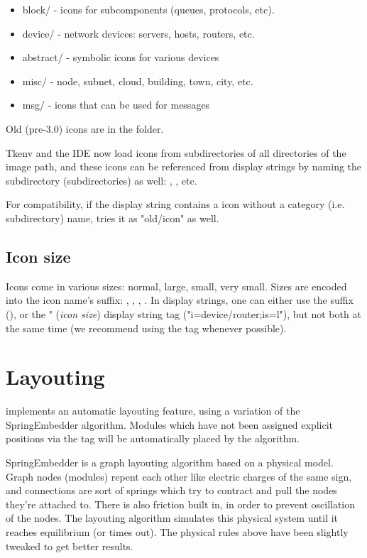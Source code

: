\begin{itemize}
  \item block/ - icons for subcomponents (queues, protocols, etc).
  \item device/ - network devices: servers, hosts, routers, etc.
  \item abstract/ - symbolic icons for various devices
  \item misc/ - node, subnet, cloud, building, town, city, etc.
  \item msg/ - icons that can be used for messages
\end{itemize}

Old (pre-3.0) icons are in the  folder.

Tkenv and the IDE now load icons from subdirectories of all directories
of the image path, and these icons can be referenced from display strings
by naming the subdirectory (subdirectories) as well:
, , etc.

For compatibility, if the display string contains a icon without
a category (i.e. subdirectory) name, {\opp} tries it as "old/icon" as well.

\subsection{Icon size}

Icons come in various sizes: normal, large, small, very small. Sizes are
encoded into the icon name's suffix: , , , .
In display strings, one can either use the suffix (),
or the " (\textit{icon size}) display string tag ("i=device/router;is=l"),
but not both at the same time (we recommend using the  tag whenever possible).


\section{Layouting}
\label{sec:ch-graphics:layouting}

{\opp} implements an automatic layouting feature, using
a variation of the SpringEmbedder algorithm. Modules which have
not been assigned explicit positions via the  tag will be
automatically placed by the algorithm.

SpringEmbedder is a graph layouting algorithm based on a physical model.
Graph nodes (modules) repent each other like electric charges
of the same sign, and connections are sort of springs which try
to contract and pull the nodes they're attached to. There is also friction
built in, in order to prevent oscillation of the nodes. The layouting algorithm
simulates this physical system until it reaches equilibrium
(or times out). The physical rules above have been slightly tweaked
to get better results.

